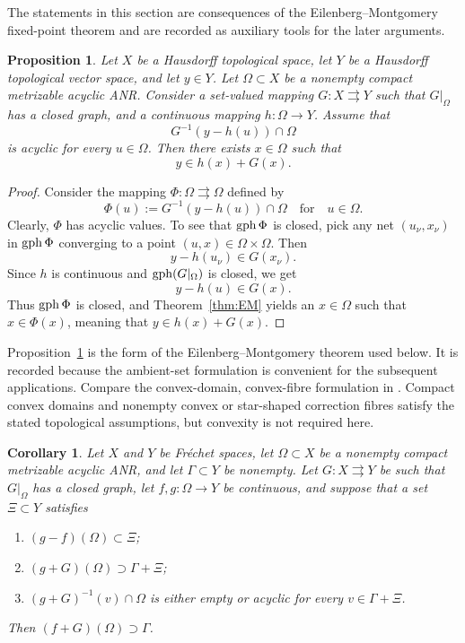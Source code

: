 \documentclass[11pt]{amsart}
\newtheorem{proposition}[theorem]{Proposition}
\newtheorem{corollary}[theorem]{Corollary}
\theoremstyle{definition}
\theoremstyle{remark}
\newcommand{\tto}{\rightrightarrows}
\newcommand{\gph}{\mathop{\rm gph}\nolimits}
\begin{document}
	The statements in this section are consequences of the
	Eilenberg--Montgomery fixed-point theorem and are recorded as auxiliary
	tools for the later arguments.
	
	\begin{proposition}
		\label{thm:ambient-range}
		Let $X$ be a Hausdorff topological space, let $Y$ be a Hausdorff
		topological vector space, and let $y\in Y$. Let $\Omega\subset X$ be
		a nonempty compact metrizable acyclic ANR. Consider a set-valued
		mapping $G:X\tto Y$ such that $G|_{\Omega}$ has a closed graph, and
		a continuous mapping $h:\Omega\longrightarrow Y$. Assume that
		$$
		G^{-1}(y-h(u))\cap\Omega
		$$
		is acyclic for every $u\in\Omega$. Then there exists $x\in\Omega$
		such that
		$$
		y\in h(x)+G(x).
		$$
	\end{proposition}
	
	\begin{proof}
		Consider the mapping $\Phi:\Omega\tto\Omega$ defined by
		$$
		\Phi(u):=G^{-1}(y-h(u))\cap\Omega\quad \text{for}\quad u\in \Omega.
		$$
		Clearly, $\Phi$ has acyclic values.  To see that $\gph\Phi$ is closed,
		pick any net $(u_\nu,x_\nu)$ in $\gph\Phi$ converging
		to a point $(u,x)\in\Omega\times\Omega$.  Then
		$$
		y-h(u_\nu)\in G(x_\nu).
		$$
		Since $h$ is continuous and $\gph(G|_{\Omega})$ is closed, we get
		$$
		y-h(u)\in G(x).
		$$
		Thus $\gph\Phi$ is closed, and Theorem~\ref{thm:EM} yields
		an $x\in\Omega$ such that $x\in\Phi(x)$, meaning that
		$y\in h(x)+G(x)$.
	\end{proof}
	
	Proposition~\ref{thm:ambient-range} is the form of the
	Eilenberg--Montgomery theorem used below.  It is recorded because the
	ambient-set formulation is convenient for the subsequent applications.
	Compare the convex-domain, convex-fibre formulation in
	\cite[Theorem~2.1]{CibulkaRoubalSetValued}.  Compact convex domains and
	nonempty convex or star-shaped correction fibres satisfy the stated
	topological assumptions, but convexity is not required here.
	
	\begin{corollary}
		\label{cor:error-set}
		Let $X$ and $Y$ be Fr\'echet spaces, let $\Omega\subset X$ be a nonempty
		compact metrizable acyclic ANR, and let $\Gamma\subset Y$ be nonempty.
		Let $G:X\tto Y$ be such that $G|_\Omega$ has a closed graph, let
		$f,g:\Omega\longrightarrow Y$ be continuous, and suppose that a set $\Xi\subset Y$
		satisfies
		\begin{enumerate}[label={\rm (\roman*)}]
			\item $(g-f)(\Omega)\subset\Xi$;
			\item $(g+G)(\Omega)\supset\Gamma+\Xi$;
			\item $(g+G)^{-1}(v)\cap\Omega$ is either empty or acyclic for every
			$v\in\Gamma+\Xi$.
		\end{enumerate}
		Then $(f+G)(\Omega)\supset\Gamma$.
	\end{corollary}
	
\end{document}
